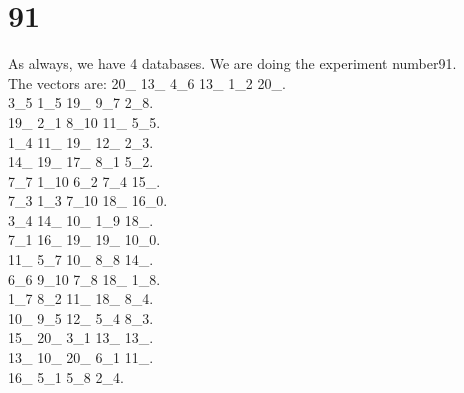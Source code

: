 \chapter{91}
\indent As always, we have 4 databases. We are doing the experiment number91.\\
The vectors are:
20\_ 13\_ 4\_6 13\_ 1\_2 20\_.\\3\_5 1\_5 19\_ 9\_7 2\_8.\\19\_ 2\_1 8\_10 11\_ 5\_5.\\1\_4 11\_ 19\_ 12\_ 2\_3.\\14\_ 19\_ 17\_ 8\_1 5\_2.\\7\_7 1\_10 6\_2 7\_4 15\_.\\7\_3 1\_3 7\_10 18\_ 16\_0.\\3\_4 14\_ 10\_ 1\_9 18\_.\\7\_1 16\_ 19\_ 19\_ 10\_0.\\11\_ 5\_7 10\_ 8\_8 14\_.\\6\_6 9\_10 7\_8 18\_ 1\_8.\\1\_7 8\_2 11\_ 18\_ 8\_4.\\10\_ 9\_5 12\_ 5\_4 8\_3.\\15\_ 20\_ 3\_1 13\_ 13\_.\\13\_ 10\_ 20\_ 6\_1 11\_.\\16\_ 5\_1 5\_8 2\_4.\\